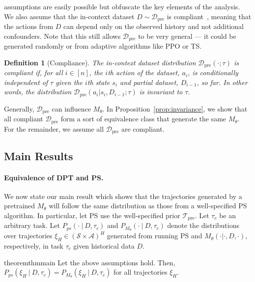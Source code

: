 \documentclass{article}
\newcommand{\Acal}{\mathcal{A}}
\newcommand{\Dcal}{\mathcal{D}}
\newcommand{\Scal}{{\mathcal{S}}}
\newcommand{\Tcal}{{\mathcal{T}}}
\newcommand{\pretraind}{\Dcal_{\text{pre}}}
\newcommand{\pretraint}{\Tcal_{\text{pre}}}
\newtheorem{definition}[claim]{Definition}
\begin{document}
 assumptions are easily possible but obfuscate the key elements of the analysis.
We also assume that the in-context dataset $D \sim \pretraind$ is compliant~\citep{jin2021pessimism}, meaning that the actions from $D$ can depend only on the observed history and not additional confounders. Note that this still allows $\pretraind$ to be very general --- it could be generated randomly or from adaptive algorithms like PPO or TS.
\begin{definition}[Compliance]\label{def:compliant}
    The in-context dataset distribution $\pretraind(\cdot; \tau)$ is \emph{compliant} if, for all $i \in [n]$, the $i$th action of the dataset, $a_i$, is conditionally independent of $\tau$ given the $i$th state $s_i$ and partial dataset, $D_{i - 1}$, so far. In other words, the distribution $\pretraind(a_i | s_i, D_{i - 1}; \tau)$ is invariant to $\tau$.
\end{definition}
Generally, $\pretraind$ can influence $M_{\theta}$. In Proposition~\ref{prop:invariance}, we show that all compliant $\pretraind$ form a sort of equivalence class that generate the same $M_{\theta}$. For the remainder, we assume all $\pretraind$ are compliant.
\subsection{Main Results}
\paragraph{Equivalence of DPT and PS.} We now state our main result which shows that the trajectories generated by a pretrained $M_{\theta}$ will follow the same distribution as those from a well-specified PS algorithm. In particular, let PS use the well-specified prior $\pretraint$. Let $\tau_c$ be an arbitrary task.
Let $P_{ps}(\cdot \ |\  D, \tau_c)$ and $P_{M_{\theta}}(\cdot \ | \ D, \tau_c)$ denote the distributions over trajectories $\xi_H \in (\Scal \times \Acal)^{H}$ generated from running PS and $M_{\theta}(\cdot | \cdot, D, \cdot)$, respectively, in task $\tau_c$ given historical data $D$.
\begin{restatable}{theorem}{thmmain}
\label{thm:main}
Let the above assumptions hold. Then, $P_{ps}(\xi_H  \ | \ D, \tau_c) = P_{M_{\theta}} (\xi_H \ | \ D, \tau_c)$ for all trajectories $\xi_H$.
\end{restatable}
\end{document}
